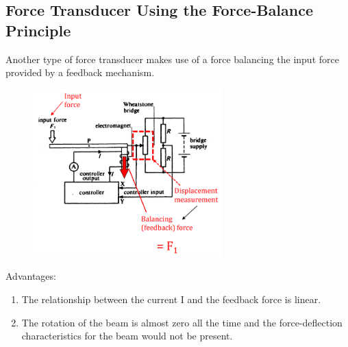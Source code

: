 \documentclass[class=report, crop=false, 12pt,a4paper]{standalone}
\begin{document}
\subsection{Force Transducer Using the Force-Balance Principle}
Another type of force transducer makes use of a force balancing the input force provided by a feedback mechanism.
\begin{figure}[H]
  \centering
  \includegraphics[width = 0.65\textwidth]{../img/Mdiagram26.png}
\end{figure}
Advantages:
\begin{enumerate}
  \item The relationship between the current I and the feedback force is linear.
  \item The rotation of the beam is almost zero all the time and the force-deflection characteristics for the beam would not be present. 
\end{enumerate}
\end{document}
